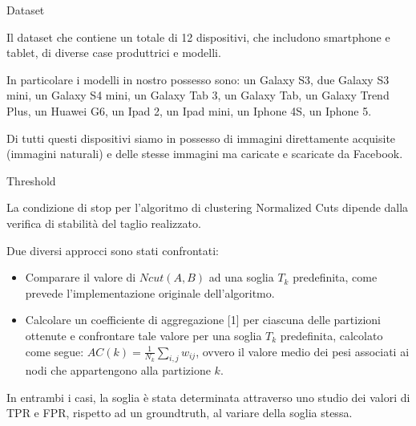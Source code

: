 
\begin{tframe}{Dataset}

Il dataset che contiene un totale di 12 dispositivi, che includono smartphone e tablet, di diverse case produttrici e modelli.

\vspace{0.1in}

In particolare i modelli in nostro possesso sono: un Galaxy S3, due Galaxy S3 mini, un Galaxy S4 mini, un Galaxy Tab 3, un Galaxy Tab, un Galaxy Trend Plus, un Huawei G6, un Ipad 2, un Ipad mini, un Iphone 4S, un Iphone 5. 

\vspace{0.1in}

Di tutti questi dispositivi siamo in possesso di immagini direttamente acquisite (immagini naturali) e delle stesse immagini ma caricate e scaricate da Facebook.


\end{tframe}


\begin{tframe}{Threshold}

La condizione di stop per l'algoritmo di clustering Normalized Cuts dipende dalla verifica di stabilità del taglio realizzato.

\vspace{0.1in}

Due diversi approcci sono stati confrontati:
\begin{itemize}
\item Comparare il valore di $Ncut(A, B)$ ad una soglia $T_{k}$ predefinita, come prevede l'implementazione originale dell'algoritmo.
\item Calcolare un coefficiente di aggregazione [1] per ciascuna delle partizioni ottenute e confrontare tale valore per una soglia $T_{k}$ predefinita, calcolato come segue: $AC(k) = \frac{1}{N_{k}} \sum_{i, j} w_{ij}$, ovvero il valore medio dei pesi associati ai nodi che appartengono alla partizione $k$.
\end{itemize}

\vspace{0.1in}

In entrambi i casi, la soglia è stata determinata attraverso uno studio dei valori di TPR e FPR, rispetto ad un groundtruth, al variare della soglia stessa.

\end{tframe}

